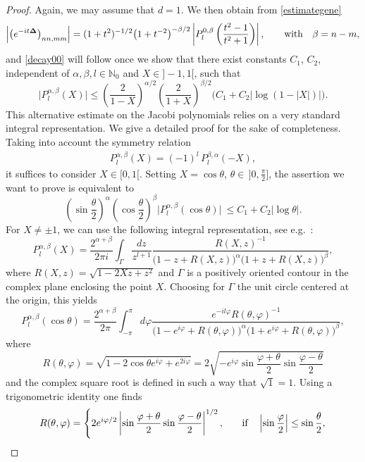 \documentclass[10pt,a4paper]{amsart}
\begin{document}
\begin{proof}
Again, we may assume that $d=1$. We then obtain from \eqref{estimategene}
\[
\left|\left(e^{-it{\bf\Delta}}\right)_{nn,mm}\right|
 = (1+t^2)^{-1/2}
\big(1+t^{-2}\big)^{-\beta/2}
\left|P_l^{0,\beta}\left(\frac{t^2-1}{t^2+1}\right)\right|,\qquad \mbox{with} \quad \beta=n-m ,
\]
and \eqref{decay00} will follow once we show that
there exist constants $C_1$, $C_2$, independent of $\alpha,\beta, l\in\mathbb
N_0$ and $X\in]-1,1[$, such that
\[
\big|P_l^{\alpha,\beta}(X)\big|\leq  \left(\frac2{1-X}\right)^{\alpha/2}
\left(\frac2{1+X}\right)^{\beta/2} \big(C_1 +
C_2\big|\log(1-|X|)\big|\big)  .
\]
This alternative estimate on the Jacobi
polynomials relies on a very standard integral representation. We give a
detailed proof for the sake of completeness.
Taking into account the symmetry
relation
\begin{gather*}
P_l^{\alpha,\beta}(X)  =  (-1)^l\,P_l^{\beta,\alpha}(-X) ,
\end{gather*}
 it suf\/f\/ices to
  consider $X\in [0,1[$.
Setting $X=\cos\theta$, $\theta\in\, ]0,\frac{\pi}{2}]$,
the assertion we want to prove is equivalent to
\[
\left(\sin\frac\theta2\right)^\alpha \left(\cos\frac\theta2\right)^\beta
\big|P_l^{\alpha,\beta}(\cos\theta)\big|\ \leq  C_1 + C_2 |\log\theta | .
\]
For $X\ne\pm1$, we can use the following integral representation, see e.g.~\cite[p. 70]{Szego}:
\[
P_l^{\alpha,\beta}(X)=\frac{2^{\alpha+\beta}}{2\pi i}
\int_\Gamma\frac{dz}{z^{l+1}} \frac{R(X,z)^{-1}}
{\big(1-z+R(X,z)\big)^\alpha\big(1+z+R(X,z)\big)^\beta} ,
\]
where $R(X,z)=\sqrt{1-2Xz+z^2}$ and $\Gamma$ is a positively oriented
contour in the complex plane enclosing the point $X$. Choosing
for $\Gamma$ the unit circle centered at the origin, this yields
\[
P_l^{\alpha,\beta}(\cos\theta)=\frac{2^{\alpha+\beta}}{2\pi}
\int_{-\pi}^\pi d\varphi \frac{e^{-il\varphi} R(\theta,\varphi)^{-1}}
{\big(1-e^{i\varphi}+R(\theta,\varphi)\big)^\alpha\big(1+e^{i\varphi}+R(\theta,\varphi)\big)^\beta} ,
\]
where
\[
R(\theta,\varphi)=\sqrt{1-2\cos\theta e^{i\varphi}+e^{2i\varphi}}=
2\sqrt{-e^{i\varphi} \sin\frac{\varphi+\theta}2 \sin\frac{\varphi-\theta}2}
\]
and the complex square root is def\/ined in such a way  that
$\sqrt1=1$. Using a trigonometric identity one f\/inds
\[
R(\theta,\varphi)=\begin{cases}
\displaystyle 2 e^{i\varphi/2} \left|\sin\frac{\varphi+\theta}2 \sin\frac{\varphi-\theta}2\right|^{1/2}, \quad  &
\displaystyle  \mbox{if}\quad \left|\sin\frac\varphi2\right|\leq\sin\frac\theta2 ,\vspace{1mm}\\

\end{cases}\]
\end{proof}
\end{document}
